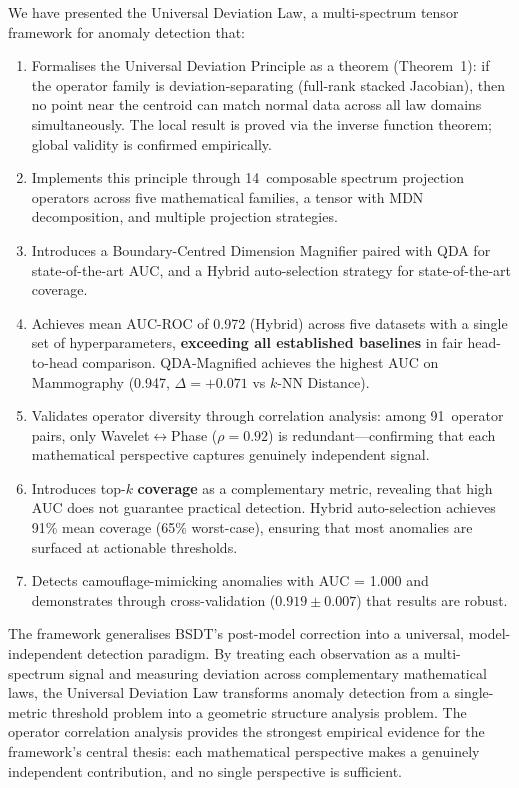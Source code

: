 \documentclass[journal]{IEEEtran}
\begin{document}
We have presented the Universal Deviation Law, a multi-spectrum tensor framework for anomaly detection that:

\begin{enumerate}
  \item Formalises the Universal Deviation Principle as a theorem (Theorem~1): if the operator family is deviation-separating (full-rank stacked Jacobian), then no point near the centroid can match normal data across all law domains simultaneously. The local result is proved via the inverse function theorem; global validity is confirmed empirically.
  \item Implements this principle through 14~composable spectrum projection operators across five mathematical families, a tensor with MDN decomposition, and multiple projection strategies.
  \item Introduces a Boundary-Centred Dimension Magnifier paired with QDA for state-of-the-art AUC, and a Hybrid auto-selection strategy for state-of-the-art coverage.
  \item Achieves mean AUC-ROC of 0.972 (Hybrid) across five datasets with a single set of hyperparameters, \textbf{exceeding all established baselines} in fair head-to-head comparison. QDA-Magnified achieves the highest AUC on Mammography (0.947, $\Delta{=}+0.071$ vs $k$-NN Distance).
  \item Validates operator diversity through correlation analysis: among 91~operator pairs, only Wavelet$\leftrightarrow$Phase ($\rho{=}0.92$) is redundant---confirming that each mathematical perspective captures genuinely independent signal.
  \item Introduces top-$k$ \textbf{coverage} as a complementary metric, revealing that high AUC does not guarantee practical detection. Hybrid auto-selection achieves 91\% mean coverage (65\% worst-case), ensuring that most anomalies are surfaced at actionable thresholds.
  \item Detects camouflage-mimicking anomalies with AUC = 1.000 and demonstrates through cross-validation ($0.919 \pm 0.007$) that results are robust.
\end{enumerate}

The framework generalises BSDT's post-model correction into a universal, model-independent detection paradigm. By treating each observation as a multi-spectrum signal and measuring deviation across complementary mathematical laws, the Universal Deviation Law transforms anomaly detection from a single-metric threshold problem into a geometric structure analysis problem. The operator correlation analysis provides the strongest empirical evidence for the framework's central thesis: each mathematical perspective makes a genuinely independent contribution, and no single perspective is sufficient.
\end{document}

